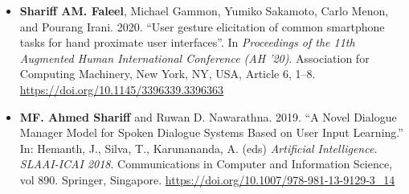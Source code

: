 \documentclass[a4paper,10pt]{article}
\begin{document}
{\begin{minipage}[t]{0.60\textwidth}
\begin{itemize}
  \item[]\textbf{Shariff AM. Faleel}, Michael Gammon, Yumiko Sakamoto, Carlo Menon, and Pourang Irani. 2020. ``User gesture elicitation of common smartphone tasks for hand proximate user interfaces''. In \textit{Proceedings of the 11th Augmented Human International Conference (AH '20)}. Association for Computing Machinery, New York, NY, USA, Article 6, 1–8. \url{https://doi.org/10.1145/3396339.3396363}
  \item[]\textbf{MF. Ahmed Shariff} and Ruwan D. Nawarathna. 2019. ``A Novel Dialogue Manager Model for Spoken Dialogue Systems Based on User Input Learning.'' In: Hemanth, J., Silva, T., Karunananda, A. (eds) \textit{Artificial Intelligence. SLAAI-ICAI 2018}. Communications in Computer and Information Science, vol 890. Springer, Singapore. \url{https://doi.org/10.1007/978-981-13-9129-3\_14}
    \end{itemize}
  \end{minipage}}
\end{document}
